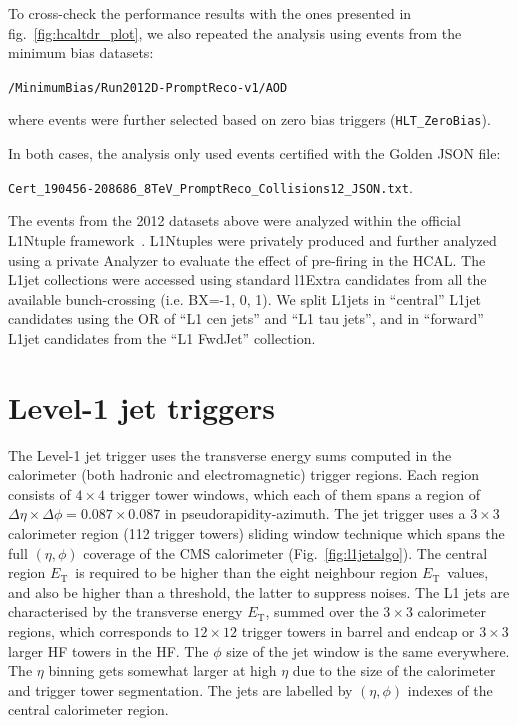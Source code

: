 \documentclass[11pt]{cmspaperpdf}
\newcommand{\et}{\ensuremath{E_{\textrm{T}}}}
\begin{document}
To cross-check the performance results with the ones presented in fig.~\ref{fig:hcaltdr_plot}, we also repeated the analysis using events from the minimum bias datasets:

\texttt{/MinimumBias/Run2012D-PromptReco-v1/AOD}

where events were further selected based on zero bias triggers (\texttt{HLT\_ZeroBias}).

In both cases, the analysis only used events certified with the Golden JSON file:

\texttt{Cert\_190456-208686\_8TeV\_PromptReco\_Collisions12\_JSON.txt}.

The events from the 2012 datasets above were analyzed within the official L1Ntuple framework~\cite{l1ntpl}. L1Ntuples were privately produced and further analyzed using a private Analyzer to evaluate the effect of pre-firing in the HCAL. The L1jet collections  were accessed using standard l1Extra candidates from all the available bunch-crossing (i.e. BX=-1, 0, 1). We split L1jets in ``central'' L1jet candidates using the OR of ``L1 cen jets'' and ``L1 tau jets'', and in ``forward'' L1jet candidates from the ``L1 FwdJet'' collection.

\section{Level-1 jet triggers}
\label{sec:l1jetalgo}

The Level-1 jet trigger uses the transverse energy sums computed in the calorimeter (both hadronic and electromagnetic) trigger regions. Each region consists of $4 \times 4 $  trigger tower windows, which each of them spans a region of $\Delta \eta \times \Delta \phi = 0.087 \times 0.087$ in pseudorapidity-azimuth. The jet trigger uses a $3 \times 3$ calorimeter region (112 trigger towers) sliding window technique which spans the full $(\eta, \phi)$ coverage
of the CMS calorimeter (Fig.~\ref{fig:l1jetalgo}). The central region \et ~is required to be higher than the eight neighbour region \et ~values,
and also be higher than a threshold, the latter to suppress noises. The L1 jets are characterised by the transverse energy \et, summed over the $3 \times 3$ calorimeter regions, which corresponds to $12 \times 12$ trigger towers in barrel and endcap or $3 \times 3$ larger HF towers in the HF. The $\phi$ size of the jet window is the same everywhere. The $\eta$ binning gets somewhat larger at high $\eta$  due to the size of the calorimeter and trigger tower segmentation. The jets are labelled by $(\eta, \phi)$ indexes of the central calorimeter region.
\end{document}
